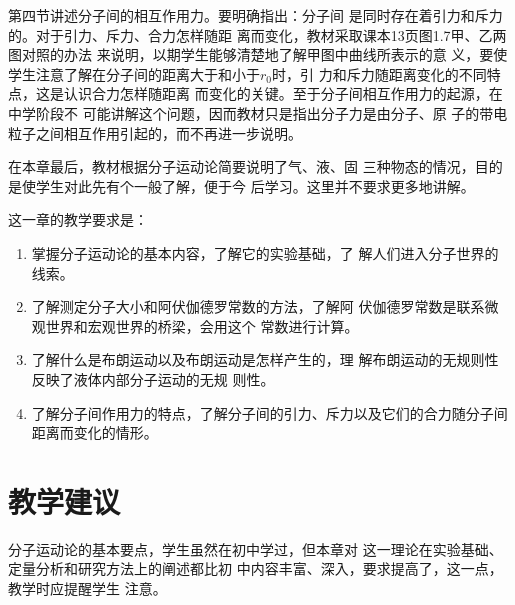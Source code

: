 第四节讲述分子间的相互作用力。要明确指出：分子间
是同时存在着引力和斥力的。对于引力、斥力、合力怎样随距
离而变化，教材采取课本13页图1.7甲、乙两图对照的办法
来说明，以期学生能够清楚地了解甲图中曲线所表示的意
义，要使学生注意了解在分子间的距离大于和小于$r_0$时，引
力和斥力随距离变化的不同特点，这是认识合力怎样随距离
而变化的关键。至于分子间相互作用力的起源，在中学阶段不
可能讲解这个问题，因而教材只是指出分子力是由分子、原
子的带电粒子之间相互作用引起的，而不再进一步说明。

在本章最后，教材根据分子运动论简要说明了气、液、固
三种物态的情况，目的是使学生对此先有个一般了解，便于今
后学习。这里并不要求更多地讲解。

这一章的教学要求是：

\begin{enumerate}
\item 掌握分子运动论的基本内容，了解它的实验基础，了
解人们进入分子世界的线索。
\item 了解测定分子大小和阿伏伽德罗常数的方法，了解阿
伏伽德罗常数是联系微观世界和宏观世界的桥梁，会用这个
常数进行计算。
\item 了解什么是布朗运动以及布朗运动是怎样产生的，理
解布朗运动的无规则性反映了液体内部分子运动的无规
则性。
\item 了解分子间作用力的特点，了解分子间的引力、斥力以及它们的合力随分子间距离而变化的情形。
\end{enumerate}

\section{教学建议}
分子运动论的基本要点，学生虽然在初中学过，但本章对
这一理论在实验基础、定量分析和研究方法上的阐述都比初
中内容丰富、深入，要求提高了，这一点，教学时应提醒学生
注意。

